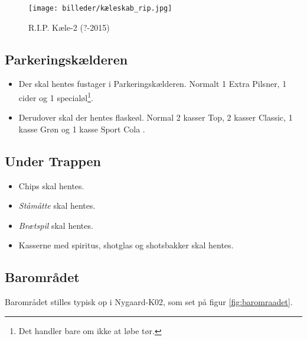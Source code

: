 \begin{figure}[H]
	\centering
	\texttt{[image: billeder/kæleskab\_rip.jpg]}
	\caption{R.I.P. Kæle-2 (?-2015)}
	\label{fig:køleskab-rip}
\end{figure}

\subsection{Parkeringskælderen}
\label{sec:pre:hopper}

\begin{itemize}
	\item Der skal hentes fustager i Parkeringskælderen. Normalt 1
	Extra Pilsner, 1 cider og 1 specialøl\footnote[1]{\label{note1}Det handler bare om ikke at løbe
	tør.}.
	\item Derudover skal der hentes flaskeøl. Normal 2 kasser Top, 2 kasser Classic, 
	1 kasse Grøn og 1 kasse Sport Cola \footnotemark[1].
\end{itemize}

\subsection{Under Trappen}
\label{sec:pre:under-trappen}

\begin{itemize}
	\item Chips skal hentes.
	\item \textit{Ståmåtte} skal hentes.
	\item \textit{Brætspil} skal hentes.
	\item Kasserne med spiritus, shotglas og shotsbakker skal hentes.
\end{itemize}

\subsection{Barområdet}
\label{sec:pre:baromradet}

Barområdet stilles typisk op i Nygaard-K02, som set på figur \ref{fig:baromraadet}.

